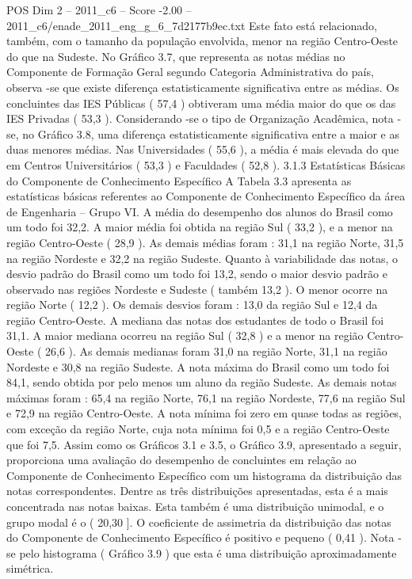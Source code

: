 \begin{textsample}{POS Dim 2 – 2011\_c6 – Score -2.00 – 2011\_c6/enade\_2011\_eng\_g\_6\_7d2177b9ec.txt}
Este fato está relacionado, também, com o tamanho da população envolvida, menor na região Centro-Oeste do que na Sudeste.
No Gráfico 3.7, que representa as notas médias no Componente de Formação Geral segundo Categoria Administrativa do país, observa -se que existe diferença estatisticamente significativa entre as médias.
Os concluintes das IES Públicas ( 57,4 ) obtiveram uma média maior do que os das IES Privadas ( 53,3 ).
Considerando -se o tipo de Organização Acadêmica, nota -se, no Gráfico 3.8, uma diferença estatisticamente significativa entre a maior e as duas menores médias.
Nas Universidades ( 55,6 ), a média é mais elevada do que em Centros Universitários ( 53,3 ) e Faculdades ( 52,8 ). 3.1.3 Estatísticas Básicas do Componente de Conhecimento Específico A Tabela 3.3 apresenta as estatísticas básicas referentes ao Componente de Conhecimento Específico da área de Engenharia – Grupo VI.
A média do desempenho dos alunos do Brasil como um todo foi 32,2.
A maior média foi obtida na região Sul ( 33,2 ), e a menor na região Centro-Oeste ( 28,9 ).
As demais médias foram : 31,1 na região Norte, 31,5 na região Nordeste e 32,2 na região Sudeste.
Quanto à variabilidade das notas, o desvio padrão do Brasil como um todo foi 13,2, sendo o maior desvio padrão e observado nas regiões Nordeste e Sudeste ( também 13,2 ).
O menor ocorre na região Norte ( 12,2 ).
Os demais desvios foram : 13,0 da região Sul e 12,4 da região Centro-Oeste.
A mediana das notas dos estudantes de todo o Brasil foi 31,1.
A maior mediana ocorreu na região Sul ( 32,8 ) e a menor na região Centro-Oeste ( 26,6 ).
As demais medianas foram 31,0 na região Norte, 31,1 na região Nordeste e 30,8 na região Sudeste.
A nota máxima do Brasil como um todo foi 84,1, sendo obtida por pelo menos um aluno da região Sudeste.
As demais notas máximas foram : 65,4 na região Norte, 76,1 na região Nordeste, 77,6 na região Sul e 72,9 na região Centro-Oeste.
A nota mínima foi zero em quase todas as regiões, com exceção da região Norte, cuja nota mínima foi 0,5 e a região Centro-Oeste que foi 7,5.
Assim como os Gráficos 3.1 e 3.5, o Gráfico 3.9, apresentado a seguir, proporciona uma avaliação do desempenho de concluintes em relação ao Componente de Conhecimento Específico com um histograma da distribuição das notas correspondentes.
Dentre as três distribuições apresentadas, esta é a mais concentrada nas notas baixas.
Esta também é uma distribuição unimodal, e o grupo modal é o ( 20,30 ].
O coeficiente de assimetria da distribuição das notas do Componente de Conhecimento Específico é positivo e pequeno ( 0,41 ).
Nota -se pelo histograma ( Gráfico 3.9 ) que esta é uma distribuição aproximadamente simétrica.

\end{textsample}
